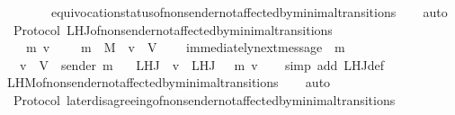 \begin{isabellebody}
\ \ \ \ \ \ \ \ equivocation{\isacharunderscore}status{\isacharunderscore}of{\isacharunderscore}non{\isacharunderscore}sender{\isacharunderscore}not{\isacharunderscore}affected{\isacharunderscore}by{\isacharunderscore}minimal{\isacharunderscore}transitions\isanewline
\ \ \isamarkupfalse%
\ auto%
\endisatagproof
{\isafoldproof}%
%
\isadelimproof
\isanewline
%
\endisadelimproof
\isanewline
\isanewline
{}\isamarkupfalse%
\ {\isacharparenleft}\ Protocol{\isacharparenright}\ L{\isacharunderscore}H{\isacharunderscore}J{\isacharunderscore}of{\isacharunderscore}non{\isacharunderscore}sender{\isacharunderscore}not{\isacharunderscore}affected{\isacharunderscore}by{\isacharunderscore}minimal{\isacharunderscore}transitions\ {\isacharcolon}\isanewline
\ \ {\isachardoublequoteopen}{\isasymforall}\ {\isasymsigma}\ m\ v{\isachardot}\ {\isasymsigma}\ {\isasymin}\ {\isasymSigma}\ {\isasymand}\ m\ {\isasymin}\ M\ {\isasymand}\ v\ {\isasymin}\ V\ \isanewline
\ \ {\isasymlongrightarrow}\ immediately{\isacharunderscore}next{\isacharunderscore}message\ {\isacharparenleft}{\isasymsigma}{\isacharcomma}\ m{\isacharparenright}\isanewline
\ \ {\isasymlongrightarrow}\ v\ {\isasymin}\ V\ {\isacharminus}\ {\isacharbraceleft}sender\ m{\isacharbraceright}\isanewline
\ \ {\isasymlongrightarrow}\ L{\isacharunderscore}H{\isacharunderscore}J\ {\isasymsigma}\ v\ {\isacharequal}\ L{\isacharunderscore}H{\isacharunderscore}J\ {\isacharparenleft}{\isasymsigma}\ {\isasymunion}\ {\isacharbraceleft}m{\isacharbraceright}{\isacharparenright}\ v{\isachardoublequoteclose}\isanewline
%
\isadelimproof
\ \ %
\endisadelimproof
%
\isatagproof
{}\isamarkupfalse%
\ {\isacharparenleft}simp\ add{\isacharcolon}\ L{\isacharunderscore}H{\isacharunderscore}J{\isacharunderscore}def{\isacharparenright}\ \isanewline
\ \ \isamarkupfalse%
\ L{\isacharunderscore}H{\isacharunderscore}M{\isacharunderscore}of{\isacharunderscore}non{\isacharunderscore}sender{\isacharunderscore}not{\isacharunderscore}affected{\isacharunderscore}by{\isacharunderscore}minimal{\isacharunderscore}transitions\isanewline
\ \ \isamarkupfalse%
\ auto%
\endisatagproof
{\isafoldproof}%
%
\isadelimproof
\ \isanewline
%
\endisadelimproof
\isanewline
\isanewline
{}\isamarkupfalse%
\ {\isacharparenleft}\ Protocol{\isacharparenright}\ later{\isacharunderscore}disagreeing{\isacharunderscore}of{\isacharunderscore}non{\isacharunderscore}sender{\isacharunderscore}not{\isacharunderscore}affected{\isacharunderscore}by{\isacharunderscore}minimal{\isacharunderscore}transitions\ {\isacharcolon}\isanewline

\end{isabellebody}

